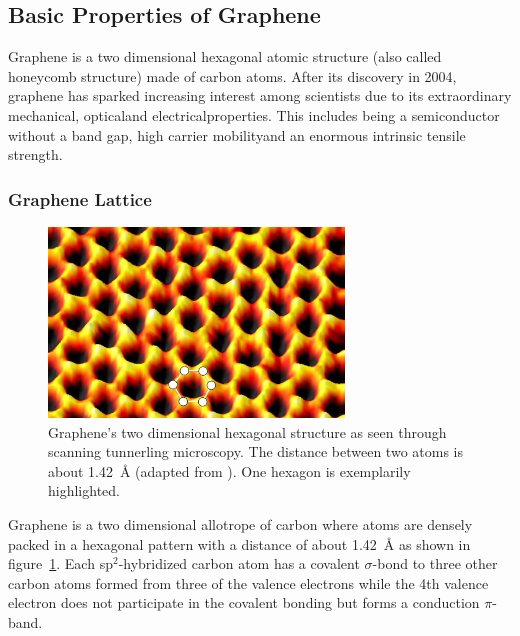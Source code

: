 \subsection{Basic Properties of Graphene}

Graphene is a two dimensional hexagonal atomic structure (also called honeycomb structure) made of carbon atoms. After its discovery in 2004\cite{novoselov}, graphene has sparked increasing interest among scientists due to its extraordinary mechanical\mcite, optical\mcite and electrical\mcite properties. This includes being a semiconductor without a band gap\mcite, high carrier mobility\mcite and an enormous intrinsic tensile strength\mcite.

\subsubsection{Graphene Lattice}
\begin{figure}[!h]
  \centering
  \includegraphics[width=0.7\textwidth]{./images/graphene-spm.png}
  \caption{Graphene's two dimensional hexagonal structure as seen through scanning tunnerling microscopy. The distance between two atoms is about \SI{1.42}{\angstrom} (adapted from \mcite). One hexagon is exemplarily highlighted.}
  \label{fig:spm}
\end{figure}

Graphene is a two dimensional allotrope of carbon where atoms are densely packed in a hexagonal pattern with a distance of about \SI{1.42}{\angstrom} as shown in figure~\ref{fig:spm}. Each sp$^2$-hybridized carbon atom has a covalent $\sigma$-bond to three other carbon atoms formed from three of the valence electrons while the 4th valence electron does not participate in the covalent bonding but forms a conduction $\pi$-band.


